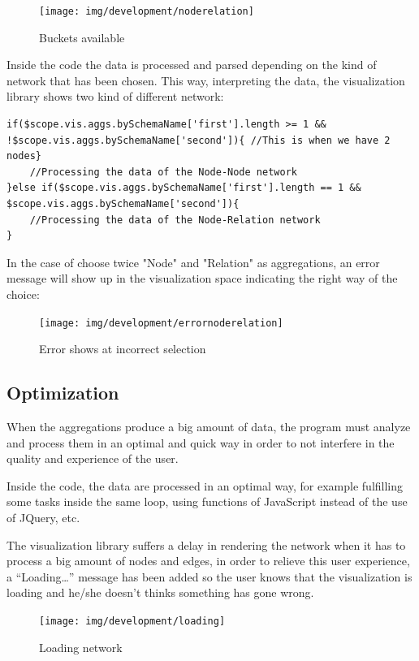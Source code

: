\documentclass[a4paper, 12pt]{book}
\begin{document}
\begin{figure}[H]
  \centering
  \texttt{[image: img/development/noderelation]}
  \caption{Buckets available}
  \label{fig:noderelationbuckets}
\end{figure}

Inside the code the data is processed and parsed depending on the kind of network that has been chosen. This way, interpreting the data, the visualization library shows two kind of different network:

\begin{lstlisting}[frame=single]
if($scope.vis.aggs.bySchemaName['first'].length >= 1 && !$scope.vis.aggs.bySchemaName['second']){ //This is when we have 2 nodes}
	//Processing the data of the Node-Node network
}else if($scope.vis.aggs.bySchemaName['first'].length == 1 && $scope.vis.aggs.bySchemaName['second']){
	//Processing the data of the Node-Relation network
}
\end{lstlisting}

In the case of choose twice "Node" and "Relation" as aggregations, an error message will show up in the visualization space indicating the right way of the choice:

\begin{figure}[H]
  \centering
  \texttt{[image: img/development/errornoderelation]}
  \caption{Error shows at incorrect selection}
  \label{fig:errornoderelation}
\end{figure}


\subsection{Optimization}

When the aggregations produce a big amount of data, the program must analyze and process them in an optimal and quick way in order to not interfere in the quality and experience of the user.

Inside the code, the data are processed in an optimal way, for example fulfilling some tasks inside the same loop, using functions of JavaScript instead of the use of JQuery, etc.

The visualization library suffers a delay in rendering the network when it has to process a big amount of nodes and edges, in order to relieve this user experience, a “Loading…” message has been added so the user knows that the visualization is loading and he/she doesn’t thinks something has gone wrong.
 
\begin{figure}[H]
  \centering
  \texttt{[image: img/development/loading]}
  \caption{Loading network}
  \label{fig:errornoderelation}
\end{figure}
\end{document}
